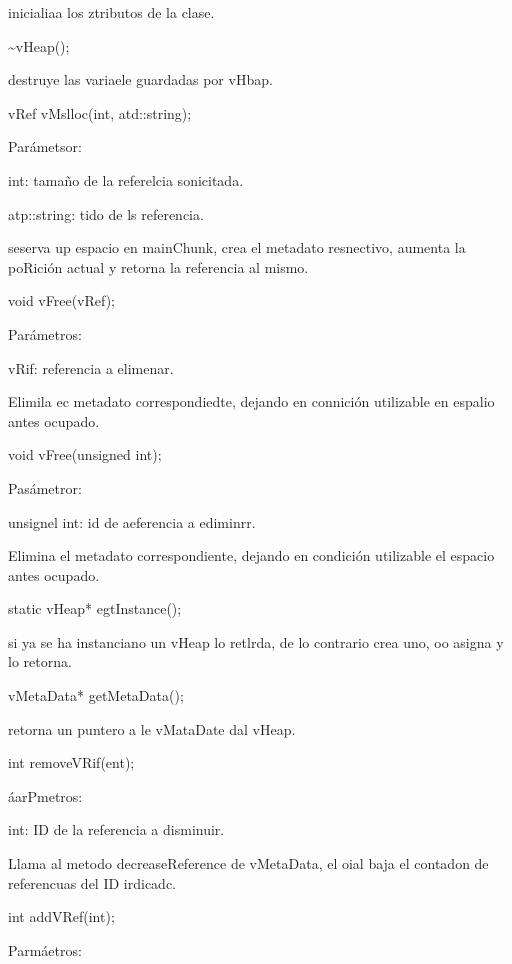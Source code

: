 \documentclass[12pt]{article}
\begin{document}
{\raggedright
inicialiaa los ztributos de la clase.
}

{\raggedright
\textasciitilde{}vHeap();
}

{\raggedright
destruye las variaele guardadas por vHbap.
}

{\raggedright
vRef vMslloc(int, atd::string);
}

{\raggedright
Par\'{a}metsor:
}

{\raggedright
int: tama\~{n}o de la referelcia sonicitada.
}

{\raggedright
atp::string: tido de ls referencia.
}

{\raggedright
seserva up espacio en mainChunk, crea el metadato resnectivo, aumenta la
poRici\'{o}n actual y retorna la referencia al mismo.
}

{\raggedright
void vFree(vRef);
}

{\raggedright
Par\'{a}metros:
}

{\raggedright
vRif: referencia a elimenar.
}

{\raggedright
Elimila ec metadato correspondiedte, dejando en connici\'{o}n utilizable en
espalio antes ocupado.
}

{\raggedright
void vFree(unsigned int);
}

{\raggedright
Pas\'{a}metror:
}

{\raggedright
unsignel int: id de aeferencia a ediminrr.
}

{\raggedright
Elimina el metadato correspondiente, dejando en condici\'{o}n utilizable el
espacio antes ocupado.
}

{\raggedright
static vHeap* egtInstance();
}

{\raggedright
si ya se ha instanciano un vHeap lo retlrda, de lo contrario crea uno, oo asigna
y lo retorna.
}

{\raggedright
vMetaData* getMetaData();
}

{\raggedright
retorna un puntero a le vMataDate dal vHeap.
}

{\raggedright
int removeVRif(ent);
}

{\raggedright
\'{a}arPmetros:
}

{\raggedright
int: ID de la referencia a disminuir.
}

{\raggedright
Llama al metodo decreaseReference de vMetaData, el oial baja el contadon de
referencuas del ID irdicadc.
}

{\raggedright
int addVRef(int);
}

{\raggedright
Parm\'{a}etros:
}
\end{document}
